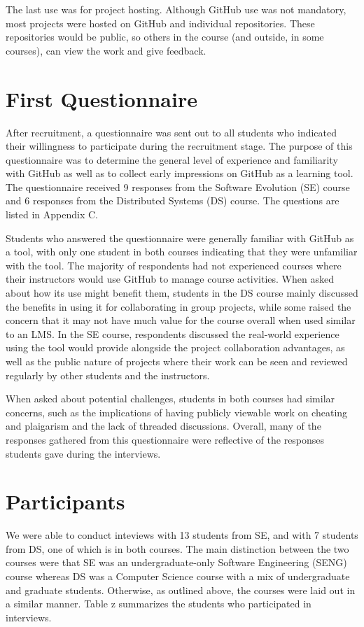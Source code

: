 The last use was for project hosting. Although GitHub use was not mandatory, most projects were hosted on GitHub and individual repositories. These repositories would be public, so others in the course (and outside, in some courses), can view the work and give feedback. %

\section{First Questionnaire}
After recruitment, a questionnaire was sent out to all students who indicated their willingness to participate during the recruitment stage. The purpose of this questionnaire was to determine the general level of experience and familiarity with GitHub as well as to collect early impressions on GitHub as a learning tool. The questionnaire received 9 responses from the Software Evolution (SE) course and 6 responses from the Distributed Systems (DS) course. The questions are listed in Appendix C.


Students who answered the questionnaire were generally familiar with GitHub as a tool, with only one student in both courses indicating that they were unfamiliar with the tool. The majority of respondents had not experienced courses where their instructors would use GitHub to manage course activities. When asked about how its use might benefit them, students in the DS course mainly discussed the benefits in using it for collaborating in group projects, while some raised the concern that it may not have much value for the course overall when used similar to an LMS. In the SE course, respondents discussed the real-world experience using the tool would provide alongside the project collaboration advantages, as well as the public nature of projects where their work can be seen and reviewed regularly by other students and the instructors.

When asked about potential challenges, students in both courses had similar concerns, such as the implications of having publicly viewable work on cheating and plaigarism and the lack of threaded discussions. Overall, many of the responses gathered from this questionnaire were reflective of the responses students gave during the interviews.

\section{Participants}
We were able to conduct inteviews with 13 students from SE, and with 7 students from DS, one of which is in both courses. The main distinction between the two courses were that SE was an undergraduate-only Software Engineering (SENG) course whereas DS was a Computer Science course with a mix of undergraduate and graduate students. Otherwise, as outlined above, the courses were laid out in a similar manner. Table z summarizes the students who participated in interviews.

